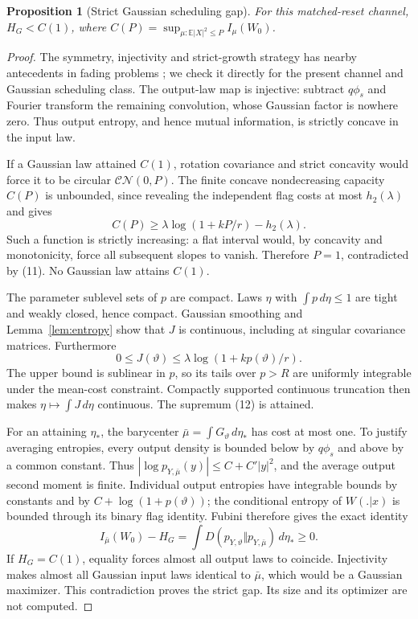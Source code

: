 \documentclass[11pt]{article}
\newtheorem{proposition}[theorem]{Proposition}
\newcommand{\E}{\mathbb E}
\newcommand{\CN}{\mathcal{CN}}
\begin{document}
\begin{proposition}[Strict Gaussian scheduling gap]\label{prop:hull}
For this matched-reset channel, \(H_G<C(1)\), where
\(C(P)=\sup_{\mu:\E|X|^2\leq P}I_\mu(W_0)\).
\end{proposition}
\begin{proof}
The symmetry, injectivity and strict-growth strategy has nearby
antecedents in fading problems \cite{catalano,tu}; we check it directly
for the present channel and Gaussian scheduling class.
The output-law map is injective: subtract \(q\phi_s\) and Fourier
transform the remaining convolution, whose Gaussian factor is nowhere
zero. Thus output entropy, and hence mutual information, is strictly
concave in the input law.

If a Gaussian law attained \(C(1)\), rotation covariance and strict
concavity would force it to be circular \(\CN(0,P)\).
The finite concave nondecreasing capacity \(C(P)\) is unbounded, since
revealing the independent flag costs at most \(h_2(\lambda)\) and gives
\[
 C(P)\geq\lambda\log(1+kP/r)-h_2(\lambda).
\]
Such a function is strictly increasing: a flat interval would, by
concavity and monotonicity, force all subsequent slopes to vanish.
Therefore \(P=1\), contradicted by (11). No Gaussian law attains \(C(1)\).

The parameter sublevel sets of \(p\) are compact. Laws \(\eta\) with
\(\int p\,d\eta\leq1\) are tight and weakly closed, hence compact.
Gaussian smoothing and Lemma~\ref{lem:entropy} show that \(J\) is continuous,
including at singular covariance matrices. Furthermore
\[
 0\leq J(\vartheta)\leq\lambda\log(1+kp(\vartheta)/r).
\]
The upper bound is sublinear in \(p\), so its tails over \(p>R\)
are uniformly integrable under the mean-cost constraint.
Compactly supported continuous truncation then makes
\(\eta\mapsto\int J\,d\eta\) continuous. The supremum (12) is attained.

For an attaining \(\eta_*\), the barycenter
\(\bar\mu=\int G_\vartheta\,d\eta_*\) has cost at most one.
To justify averaging entropies, every output density is bounded below by
\(q\phi_s\) and above by a common constant. Thus
\(|\log p_{Y,\bar\mu}(y)|\leq C+C'|y|^2\), and the average output
second moment is finite. Individual output entropies have integrable
bounds by constants and by \(C+\log(1+p(\vartheta))\); the conditional
entropy of \(W(.|x)\) is bounded through its binary flag identity.
Fubini therefore gives the exact identity
\[
 I_{\bar\mu}(W_0)-H_G
   =\int D(p_{Y,\vartheta}\Vert p_{Y,\bar\mu})\,d\eta_*\geq0 .
\]
If \(H_G=C(1)\), equality forces almost all output laws to coincide.
Injectivity makes almost all Gaussian input laws identical to
\(\bar\mu\), which would be a Gaussian maximizer. This contradiction
proves the strict gap. Its size and its optimizer are not computed.
\end{proof}
\end{document}
